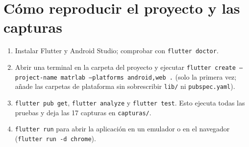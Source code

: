 \appendix
\section{Cómo reproducir el proyecto y las capturas}
\label{anx:repro}
\begin{enumerate}
	\item Instalar Flutter y Android Studio; comprobar con \texttt{flutter doctor}.
	\item Abrir una terminal en la carpeta del proyecto y ejecutar \texttt{flutter create --project-name matrlab --platforms android,web .} (solo la primera vez; añade las carpetas de plataforma sin sobrescribir \texttt{lib/} ni \texttt{pubspec.yaml}).
	\item \texttt{flutter pub get}, \texttt{flutter analyze} y \texttt{flutter test}. Esto ejecuta todas las pruebas y deja las 17 capturas en \texttt{capturas/}.
	\item \texttt{flutter run} para abrir la aplicación en un emulador o en el navegador (\texttt{flutter run -d chrome}).
\end{enumerate}
